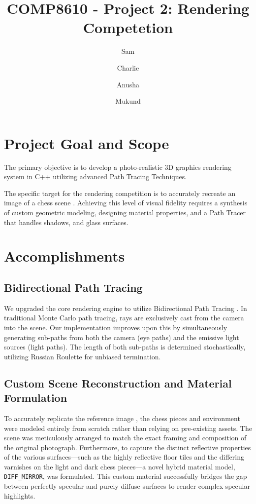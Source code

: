 \documentclass[11pt, a4paper]{article}
\title{COMP8610 - Project 2: Rendering Competetion}
\author{Sam \and Charlie \and Anusha \and Mukund}
\date{}
\begin{document}

\maketitle

\section*{Project Goal and Scope}

The primary objective is to develop a photo-realistic 3D graphics rendering system in C++ utilizing advanced Path Tracing Techniques. 

The specific target for the rendering competition is to accurately recreate an image of a chess scene \cite{dartmouth_rendering}. Achieving this level of visual fidelity requires a synthesis of custom geometric modeling, designing material properties, and a Path Tracer that handles shadows, and glass surfaces.


\section*{Accomplishments}
\subsection*{Bidirectional Path Tracing }
We upgraded the core rendering engine to utilize Bidirectional Path Tracing \cite{Vlnas2018}. In traditional Monte Carlo path tracing, rays are exclusively cast from the camera into the scene. Our implementation improves upon this by simultaneously generating sub-paths from both the camera (eye paths) and the emissive light sources (light paths). The length of both sub-paths is determined stochastically, utilizing Russian Roulette for unbiased termination.

\subsection*{Custom Scene Reconstruction and Material Formulation}
To accurately replicate the reference image \cite{dartmouth_rendering}, the chess pieces and environment were modeled entirely from scratch rather than relying on pre-existing assets. The scene was meticulously arranged to match the exact framing and composition of the original photograph. Furthermore, to capture the distinct reflective properties of the various surfaces—such as the highly reflective floor tiles and the differing varnishes on the light and dark chess pieces—a novel hybrid material model, \texttt{DIFF\_MIRROR}, was formulated. This custom material successfully bridges the gap between perfectly specular and purely diffuse surfaces to render complex specular highlights.
\end{document}
